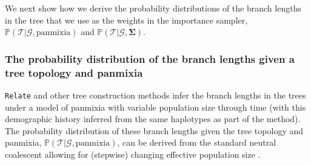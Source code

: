 \documentclass[12pt]{article}
\begin{document}

We next show how we derive the probability distributions of the branch lengths in the tree that we use as the weights in the importance sampler, $\mathbb{P}(\mathcal{T} | \mathcal{G}, \mathrm{panmixia})$ and $\mathbb{P}(\mathcal{T} | \mathcal{G}, \mathbf{\Sigma})$.

\subsubsection*{The probability distribution of the branch lengths given a tree topology and panmixia}

\texttt{Relate} and other tree construction methods infer the branch lengths in the trees under a model of panmixia with variable population size through time (with this demographic history inferred from the same haplotypes as part of the method). 
The probability distribution of these branch lengths given the tree topology and panmixia, $\mathbb{P}(\mathcal{T} | \mathcal{G}, \mathrm{panmixia})$, can be derived from the standard neutral coalescent allowing for (stepwise) changing effective population size \citep{griffiths1994sampling,meligkotsidou2007postprocessing}.
 
\end{document}
